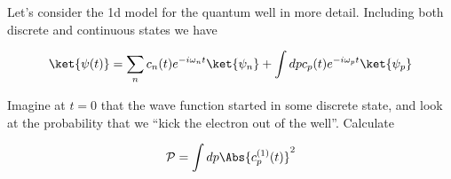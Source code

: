 Let's consider the 1d model for the quantum well in more detail.  Including both discrete and continuous states we have

\begin{equation}\label{eqn:qmTwoL10:n}
\ket{\psi(t)} = 
\sum_n c_n(t) e^{-i \omega_n t} \ket{\psi_n} + 
\int dp c_p(t) e^{-i \omega_p t} \ket{\psi_p} 
\end{equation}

Imagine at $t=0$ that the wave function started in some discrete state, and look at the probability that we ``kick the electron out of the well''.  Calculate

\begin{equation}\label{eqn:qmTwoL10:n}
\mathcal{P} = \int dp \Abs{c_p^{(1)}(t)}^2
\end{equation}

\EndArticle

